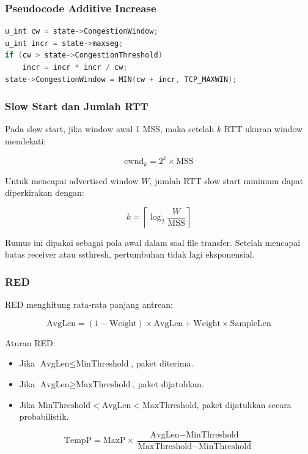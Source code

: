 \subsubsection*{Pseudocode Additive Increase}

\begin{lstlisting}[language=C,caption={Fragment Additive Increase dari sumber}]
u_int cw = state->CongestionWindow;
u_int incr = state->maxseg;
if (cw > state->CongestionThreshold)
    incr = incr * incr / cw;
state->CongestionWindow = MIN(cw + incr, TCP_MAXWIN);
\end{lstlisting}

\subsubsection*{Slow Start dan Jumlah RTT}

Pada slow start, jika window awal 1 MSS, maka setelah $k$ RTT ukuran window mendekati:

\[
\text{cwnd}_k = 2^k \times \text{MSS}
\]

Untuk mencapai advertised window $W$, jumlah RTT slow start minimum dapat diperkirakan dengan:

\[
k = \left\lceil \log_2 \frac{W}{\text{MSS}} \right\rceil
\]

Rumus ini dipakai sebagai pola awal dalam soal file transfer. Setelah mencapai batas receiver atau ssthresh, pertumbuhan tidak lagi eksponensial.

\subsubsection*{RED}

RED menghitung rata-rata panjang antrean:

\[
\text{AvgLen}=(1-\text{Weight})\times \text{AvgLen}+\text{Weight}\times \text{SampleLen}
\]

Aturan RED:

\begin{itemize}
    \item Jika $\text{AvgLen}\leq \text{MinThreshold}$, paket diterima.
    \item Jika $\text{AvgLen}\geq \text{MaxThreshold}$, paket dijatuhkan.
    \item Jika $\text{MinThreshold}<\text{AvgLen}<\text{MaxThreshold}$, paket dijatuhkan secara probabilistik.
\end{itemize}

\[
\text{TempP}=\text{MaxP}\times\frac{\text{AvgLen}-\text{MinThreshold}}{\text{MaxThreshold}-\text{MinThreshold}}
\]

